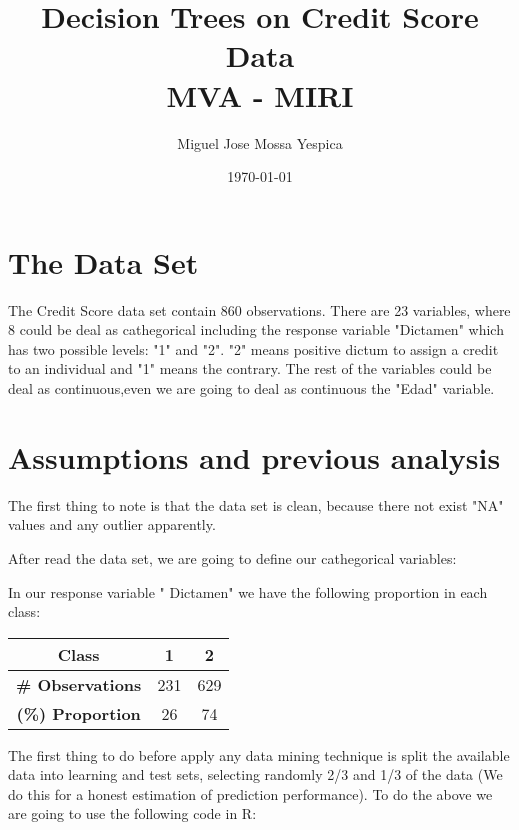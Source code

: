\documentclass[a4paper, 10pt]{article}
\title{ Decision Trees on Credit Score Data\\ MVA - MIRI}
\author{Miguel Jose Mossa Yespica}
\date{\today{}}
\begin{document}
	
	\maketitle
	
	\section{The Data Set}
	
	The Credit Score data set contain 860 observations. There are 23 variables, where 8 could be deal as cathegorical including the response variable "Dictamen" which has two possible levels: "1" and "2". "2" means positive dictum to assign a credit to an individual and "1" means the contrary. The rest of the variables could be deal as continuous,even we are going to deal as continuous the "Edad" variable.
	
	
	\section{Assumptions and previous analysis}
	
	The first thing to note is that the data set is clean, because there not exist "NA" values and any outlier apparently.  
	
	After read the data set, we are going to define our cathegorical variables:
	
	
	
	In our response variable " Dictamen" we have the following proportion in each class:
	
	 \begin{table}[H]
	 		\centering
	 	\begin{tabular}{|c||c||c|}
	 		\hline
	 			\centering
	 {\bf Class} & 1 & 2 \\ \hline
	 {\bf \# Observations } & 231 & 629\\ \hline
	 {\bf (\%) Proportion } & 26 & 74\\
	 \hline
	\end{tabular}
\end{table}

The first thing to do before apply any data mining technique is split the available data into learning and test sets, selecting randomly 2/3 and 1/3 of the data (We do this for a honest estimation of prediction performance). To do the above we are going to use the following code in R:


\end{document}
